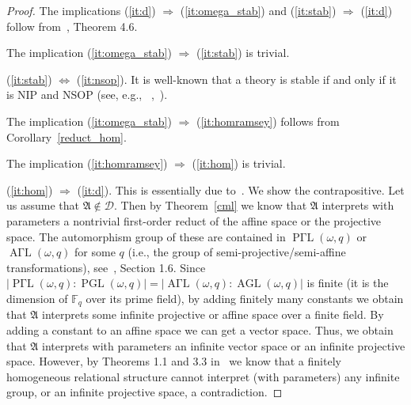 \documentclass{amsart}
\DeclareMathOperator{\AGL}{AGL}
\DeclareMathOperator{\PGL}{PGL}
\DeclareMathOperator{\AGammaL}{A \Gamma L}
\DeclareMathOperator{\PGammaL}{P \Gamma L}
\theoremstyle{definition}
\theoremstyle{remark}
\numberwithin{equation}{section}
\newcommand\green[1]{\textcolor{green!50!black}{#1}}
\newcommand{\fa}{\mathfrak{A}}
\begin{document}
\begin{proof}
	The implications (\ref{it:d}) $\Rightarrow$ (\ref{it:omega_stab}) and (\ref{it:stab}) $\Rightarrow$ (\ref{it:d}) follow from~\cite{LachlanIndiscernible}, Theorem 4.6.
	
	The implication (\ref{it:omega_stab}) $\Rightarrow$ (\ref{it:stab}) is trivial.
	
	(\ref{it:stab}) $\Leftrightarrow$ (\ref{it:nsop}). It is well-known that a theory is stable if and only if it is NIP and NSOP (see, e.g., ~\cite[Theorem 2.67]{simon2015guide},~\cite{shelah1990classification}).

	The implication {(\ref{it:omega_stab})} $\Rightarrow$ (\ref{it:homramsey}) follows from %
Corollary~\ref{reduct_hom}.
	
	The implication (\ref{it:homramsey}) $\Rightarrow$ (\ref{it:hom}) is trivial.
	
	(\ref{it:hom}) $\Rightarrow$ (\ref{it:d}). This is essentially due to~\cite[Theorem 3.4]{macpherson1991interpreting}. We show the contrapositive. Let us assume that $\fa\not\in \mathcal{D}$. Then by Theorem~\ref{cml} we know that $\fa$ interprets with parameters a nontrivial first-order reduct of the affine space or the projective space. The automorphism group of these are contained in $\PGammaL(\omega,q)$ or $\AGammaL(\omega,q)$ for some $q$ (i.e., the group of semi-projective/semi-affine transformations), see~\cite{EvansIvanovMacpherson}, Section 1.6. Since $|\PGammaL(\omega,q):\PGL(\omega,q)|=|\AGammaL(\omega,q):\AGL(\omega,q)|$ is finite (it is the dimension of $\mathbb{F}_q$ over its prime field), by adding finitely many constants we obtain that $\fa$ interprets some infinite projective or affine space over a finite field. {By adding a constant to an affine space we can get a vector space. Thus, we obtain that $\fa$ interprets with parameters an infinite vector space or an infinite projective space. However, by Theorems 1.1 and 3.3 in~\cite{macpherson1991interpreting} we know that a finitely homogeneous relational structure cannot interpret (with parameters) any infinite group, or an infinite projective space, a contradiction.}
\end{proof}
\end{document}
